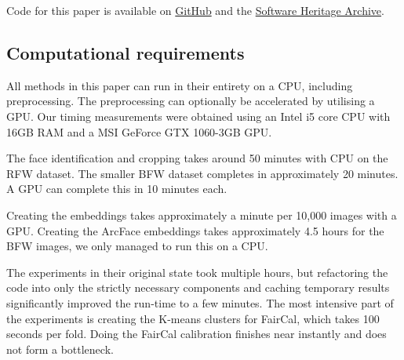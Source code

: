 Code for this paper is available on \href{https://github.com/zseljee/re-faircal}{GitHub} and the \href{https://archive.softwareheritage.org/swh:1:dir:95f2895ab0761e8a2341dc83e26cdcbbc5a0ecde}{Software Heritage Archive}.

\subsection{Computational requirements} 


All methods in this paper can run in their entirety on a CPU, including preprocessing.
The preprocessing can optionally be accelerated by utilising a GPU.
Our timing measurements were obtained using an Intel i5 core CPU with 16GB RAM and a MSI GeForce GTX 1060-3GB GPU.

The face identification and cropping takes around 50 minutes with CPU on the RFW dataset.
The smaller BFW dataset completes in approximately 20 minutes.
A GPU can complete this in 10 minutes each.

Creating the embeddings takes approximately a minute per 10,000 images with a GPU.
Creating the ArcFace embeddings takes approximately 4.5 hours for the BFW images, we only managed to run this on a CPU.

The experiments in their original state took multiple hours, but refactoring the code into only the strictly necessary components and caching temporary results significantly improved the run-time to a few minutes.
The most intensive part of the experiments is creating the K-means clusters for FairCal, which takes 100 seconds per fold.
Doing the FairCal calibration finishes near instantly and does not form a bottleneck.

